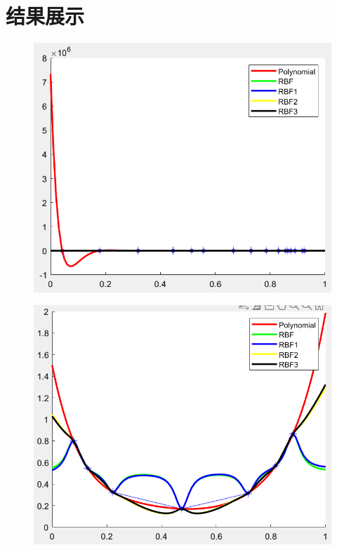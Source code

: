 \documentclass{article}
\begin{document}
	\section{结果展示}
\begin{figure}[H]
	\centering
	\includegraphics[scale=1]{result}%
	\caption{}
	\label{fig:result0}
\end{figure}
\begin{figure}[H]
	\centering
	\includegraphics[scale=1]{result0}%
	\caption{}
	\label{fig:result1}
\end{figure}
\end{document}
